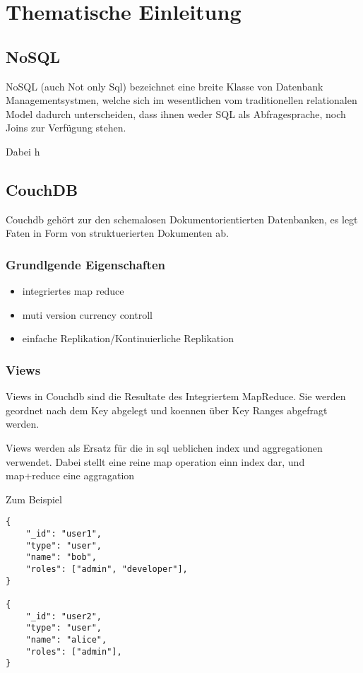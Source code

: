 \chapter{Thematische Einleitung}

\section{NoSQL}

NoSQL (auch Not only Sql) bezeichnet eine breite Klasse
von Datenbank Managementsystmen, welche sich im wesentlichen
vom traditionellen relationalen Model dadurch unterscheiden,
dass ihnen weder SQL als Abfragesprache, noch Joins zur Verfügung stehen.

Dabei h

\section{CouchDB}

Couchdb gehört zur den schemalosen Dokumentorientierten Datenbanken,
es legt Faten in Form von struktuerierten Dokumenten ab.

\subsection{Grundlgende Eigenschaften}

\begin{itemize}
\item integriertes map reduce
\item muti version currency controll
\item einfache Replikation/Kontinuierliche Replikation


\end{itemize}


\subsection{Views}

Views in Couchdb sind die Resultate des Integriertem MapReduce.
Sie werden geordnet nach dem Key abgelegt und koennen über Key Ranges abgefragt werden.


Views werden als Ersatz für die in sql ueblichen index und aggregationen verwendet.
Dabei stellt eine  reine map operation einn index dar, und map+reduce eine aggragation

\newpage
Zum Beispiel
\begin{lstlisting}
{
    "_id": "user1",
    "type": "user",
    "name": "bob",
    "roles": ["admin", "developer"],
}

{
    "_id": "user2",
    "type": "user",
    "name": "alice",
    "roles": ["admin"],
}
\end{lstlisting}



